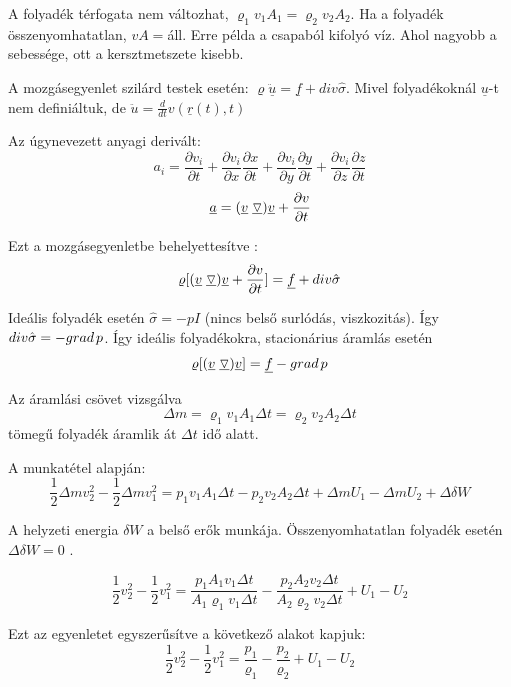 \documentclass[a4paper,titlepage,12pt]{article}
\begin{document}
A folyadék térfogata nem változhat, $\varrho_{1}v_{1}A_{1}=\varrho_{2}v_{2}A_{2}$. Ha a folyadék összenyomhatatlan, $vA=$áll. Erre példa a csapaból kifolyó víz. Ahol nagyobb a sebessége, ott a kersztmetszete kisebb. 

A mozgásegyenlet szilárd testek esetén: $\varrho\underline{\ddot{u}}=\underline{f}+div\hat{\sigma}$. Mivel folyadékoknál $\underline{u}$-t nem definiáltuk, de $\ddot{u}=\frac{d}{dt}v(\underline{r}(t),t) $

\vspace{0.25 cm}
Az úgynevezett anyagi derivált: $$a_{i}=\frac{\partial v_{i}}{\partial t}+\frac{\partial v_{i}}{\partial x}\frac{\partial x}{\partial t}+\frac{\partial v_{i}}{\partial y}\frac{\partial y}{\partial t}+\frac{\partial v_{i}}{\partial z}\frac{\partial z}{\partial t} $$ $$\underline{a}=(\underline{v}\hspace{0.1 cm}\underline{\triangledown})\underline{v}+\frac{\partial v}{\partial t}$$

Ezt a mozgásegyenletbe behelyettesítve : $$\varrho[(\underline{v}\hspace{0.1 cm}\underline{\triangledown})\underline{v}+\frac{\partial v}{\partial t}]=\underline{f}+div\hat{\sigma}$$

Ideális folyadék esetén $\hat{\sigma}=-p\hat{I}$ (nincs belső surlódás, viszkozitás). Így $div\hat{\sigma}=-grad\hspace{0.05 cm}p$. Így ideális folyadékokra, stacionárius áramlás esetén $$\varrho[(\underline{v}\hspace{0.1 cm}\underline{\triangledown})\underline{v}]=\underline{f}-grad\hspace{0.05 cm}p $$

Az áramlási csövet vizsgálva $$\Delta m=\varrho_{1}v_{1}A_{1}\Delta t=\varrho_{2}v_{2}A_{2}\Delta t $$ tömegű folyadék áramlik át $\Delta t$ idő alatt.

A munkatétel alapján: $$\frac{1}{2}\Delta mv_{2}^{2}-\frac{1}{2}\Delta mv_{1}^{2}=p_{1}v_{1}A_{1}\Delta t-p_{2}v_{2}A_{2}\Delta t+\Delta m U_{1}-\Delta m U_{2}+\Delta\delta W$$

A helyzeti energia $\delta W$ a belső erők munkája. Összenyomhatatlan folyadék esetén $\Delta\delta W=0$  .

$$\frac{1}{2}v_{2}^{2}-\frac{1}{2}v_{1}^{2}=\frac{p_{1}A_{1}v_{1}\Delta t}{A_{1}\varrho_{1}v_{1}\Delta t}-\frac{p_{2}A_{2}v_{2}\Delta t}{A_{2}\varrho_{2}v_{2}\Delta t}+U_{1}-U_{2} $$

Ezt az egyenletet egyszerűsítve a következő alakot kapjuk: $$\frac{1}{2}v_{2}^{2}-\frac{1}{2}v_{1}^{2}=\frac{p_{1}}{\varrho_{1}}-\frac{p_{2}}{\varrho_{2}}+U_{1}-U_{2} $$
\end{document}
